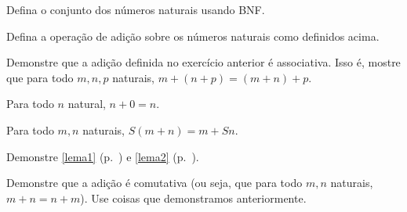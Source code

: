 \begin{exercise}
Defina o conjunto dos números naturais usando BNF.
\end{exercise}

\begin{exercise}
Defina a operação de adição sobre os números naturais como definidos acima.
\end{exercise}

\begin{exercise}
Demonstre que a adição definida no exercício anterior é associativa.
Isso é, mostre que para todo $m, n, p$ naturais, $m + (n + p) = (m + n) + p$.
\end{exercise}

\begin{definition}
	\label{lema1}
	Para todo $n$ natural, $n + 0 = n$.
\end{definition}

\begin{definition}
	\label{lema2}
	Para todo $m, n$ naturais, $S(m + n) = m + Sn$.
\end{definition}

\begin{homework}
Demonstre \ref{lema1} (p.~\pageref{lema1}) e \ref{lema2} (p.~\pageref{lema2}).
\end{homework}

\begin{exercise}
Demonstre que a adição é comutativa (ou seja, que para todo $m, n$ naturais, $m + n = n + m$).
Use coisas que demonstramos anteriormente.
\end{exercise}



